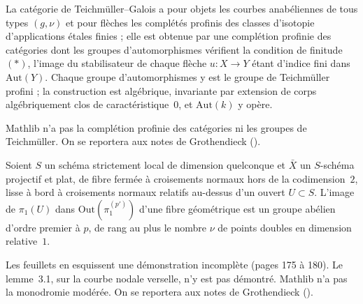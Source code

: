 \begin{encadre}
\begin{definition*}
La catégorie de Teichmüller--Galois a pour objets les courbes anabéliennes de tous types $(g, \nu)$ et pour flèches les complétés profinis des classes d'isotopie d'applications étales finies ; elle est obtenue par une complétion profinie des catégories dont les groupes d'automorphismes vérifient la condition de finitude $(\ast)$, l'image du stabilisateur de chaque flèche $u : X \to Y$ étant d'indice fini dans $\mathrm{Aut}(Y)$. Chaque groupe d'automorphismes y est le groupe de Teichmüller profini ; la construction est algébrique, invariante par extension de corps algébriquement clos de caractéristique~$0$, et $\mathrm{Aut}(k)$ y opère.
\end{definition*}
\end{encadre}
{\small Mathlib n'a pas la complétion profinie des catégories ni les groupes de Teichmüller. On se reportera aux notes de Grothendieck ().\par}

\begin{encadre}
\begin{theoreme*}\nonverifie
Soient $S$ un schéma strictement local de dimension quelconque et $\bar X$ un $S$-schéma projectif et plat, de fibre fermée à croisements normaux hors de la codimension~$2$, lisse à bord à croisements normaux relatifs au-dessus d'un ouvert $U \subset S$. L'image de $\pi_1(U)$ dans $\mathrm{Out}(\pi_1^{(p')})$ d'une fibre géométrique est un groupe abélien d'ordre premier à $p$, de rang au plus le nombre $\nu$ de points doubles en dimension relative~$1$.
\end{theoreme*}
\end{encadre}
{\small Les feuillets en esquissent une démonstration incomplète (pages 175 à 180). Le lemme~3.1, sur la courbe nodale verselle, n'y est pas démontré. Mathlib n'a pas la monodromie modérée. On se reportera aux notes de Grothendieck ().\par}

